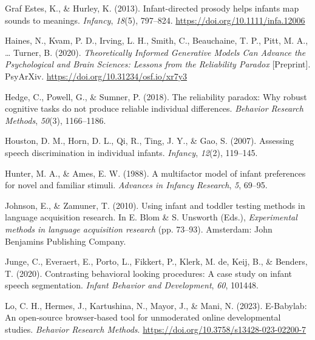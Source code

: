 \documentclass[
  man,floatsintext]{apa6}
\newlength{\cslhangindent}
\newlength{\cslentryspacingunit} %
\newenvironment{CSLReferences}[2] %
 {%
  \setlength{\parindent}{0pt}
  \ifodd #1
  \let\oldpar\par
  \def\par{\hangindent=\cslhangindent\oldpar}
  \fi
  \setlength{\parskip}{#2\cslentryspacingunit}
 }%
 {}
\begin{document}
\begin{CSLReferences}{1}{0}
\leavevmode{}%
Graf Estes, K., \& Hurley, K. (2013). Infant-directed prosody helps infants map sounds to meanings. \emph{Infancy}, \emph{18}(5), 797--824. \url{https://doi.org/10.1111/infa.12006}

\leavevmode{}%
Haines, N., Kvam, P. D., Irving, L. H., Smith, C., Beauchaine, T. P., Pitt, M. A., \ldots{} Turner, B. (2020). \emph{Theoretically {Informed} {Generative} {Models} {Can} {Advance} the {Psychological} and {Brain} {Sciences}: {Lessons} from the {Reliability} {Paradox}} {[}Preprint{]}. PsyArXiv. \url{https://doi.org/10.31234/osf.io/xr7y3}

\leavevmode{}%
Hedge, C., Powell, G., \& Sumner, P. (2018). The reliability paradox: Why robust cognitive tasks do not produce reliable individual differences. \emph{Behavior Research Methods}, \emph{50}(3), 1166--1186.

\leavevmode{}%
Houston, D. M., Horn, D. L., Qi, R., Ting, J. Y., \& Gao, S. (2007). Assessing speech discrimination in individual infants. \emph{Infancy}, \emph{12}(2), 119--145.

\leavevmode{}%
Hunter, M. A., \& Ames, E. W. (1988). A multifactor model of infant preferences for novel and familiar stimuli. \emph{Advances in Infancy Research}, \emph{5}, 69--95.

\leavevmode{}%
Johnson, E., \& Zamuner, T. (2010). Using infant and toddler testing methods in language acquisition research. In E. Blom \& S. Unsworth (Eds.), \emph{Experimental methods in language acquisition research} (pp. 73--93). Amsterdam: John Benjamins Publishing Company.

\leavevmode{}%
Junge, C., Everaert, E., Porto, L., Fikkert, P., Klerk, M. de, Keij, B., \& Benders, T. (2020). Contrasting behavioral looking procedures: A case study on infant speech segmentation. \emph{Infant Behavior and Development}, \emph{60}, 101448.

\leavevmode{}%
Lo, C. H., Hermes, J., Kartushina, N., Mayor, J., \& Mani, N. (2023). E-{Babylab}: {An} open-source browser-based tool for unmoderated online developmental studies. \emph{Behavior Research Methods}. \url{https://doi.org/10.3758/s13428-023-02200-7}


\end{CSLReferences}
\end{document}

